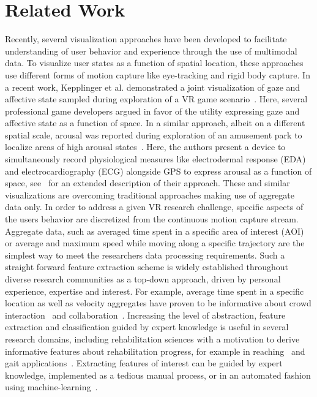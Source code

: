 \section{Related Work}
Recently, several visualization approaches have been developed to facilitate understanding of user behavior and experience through the use of multimodal data. To visualize user states as a function of spatial location, these approaches use different forms of motion capture like eye-tracking and rigid body capture. In a recent work, Kepplinger et al. demonstrated a joint visualization of gaze and affective state sampled during exploration of a VR game scenario~\cite{Kepplinger2020}. Here, several professional game developers argued in favor of the utility expressing gaze and affective state as a function of space. In a similar approach, albeit on a different spatial scale, arousal was reported during exploration of an amusement park to localize areas of high arousal states~\cite{Georges2020}. Here, the authors present a device to simultaneously record physiological measures like electrodermal response (EDA) and electrocardiography (ECG) alongside GPS to express arousal as a function of space, see~\cite{Courtemanche2018} for an extended description of their approach. These and similar visualizations are overcoming traditional approaches making use of aggregate data only. In order to address a given VR research challenge, specific aspects of the users behavior are discretized from the continuous motion capture stream. Aggregate data, such as averaged time spent in a specific area of interest (AOI) or average and maximum speed while moving along a specific trajectory are the simplest way to meet the researchers data processing requirements. Such a straight forward feature extraction scheme is widely established throughout diverse research communities as a top-down approach, driven by personal experience, expertise and interest. For example, average time spent in a specific location as well as velocity aggregates have proven to be informative about crowd interaction~\cite{Nelson2019} and collaboration~\cite{Rios2018}. Increasing the level of abstraction, feature extraction and classification guided by expert knowledge is useful in several research domains, including rehabilitation sciences with a motivation to derive informative features about rehabilitation progress, for example in reaching~\cite{DeLosReyes-Guzman2014} and gait applications~\cite{Taborri2016}. Extracting features of interest can be guided by expert knowledge, implemented as a tedious manual process, or in an automated fashion using  machine-learning~\cite{Butepage2017}.

